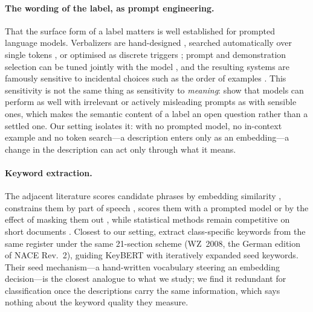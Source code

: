 \documentclass[11pt]{article}
\begin{document}
\paragraph{The wording of the label, as prompt engineering.}
That the surface form of a label matters is well established for prompted
language models. Verbalizers are hand-designed \citep{schick-schutze-2021-exploiting},
searched automatically over single tokens \citep{schick-etal-2020-automatically},
or optimised as discrete triggers \citep{shin-etal-2020-autoprompt}; prompt and
demonstration selection can be tuned jointly with the model
\citep{gao-etal-2021-making}, and the resulting systems are famously sensitive
to incidental choices such as the order of examples
\citep{lu-etal-2022-fantastically}. This sensitivity is not the same thing as
sensitivity to \emph{meaning}: \citet{webson-pavlick-2022-prompt} show that
models can perform as well with irrelevant or actively misleading prompts as
with sensible ones, which makes the semantic content of a label an open question
rather than a settled one. Our setting isolates it: with no prompted model, no
in-context example and no token search---a description enters only as an
embedding---a change in the description can act only through what it means.

\paragraph{Keyword extraction.}
The adjacent literature scores candidate phrases by embedding similarity
\citep{grootendorst-2020-keybert}, constrains them by part of speech
\citep{schopf-etal-2022-patternrank}, scores them with a prompted model
\citep{kong-etal-2023-promptrank} or by the effect of masking them out
\citep{zhang-etal-2022-mderank}, while statistical methods remain competitive on
short documents \citep{campos-etal-2020-yake}. Closest to our setting,
\citet{meisenbacher-etal-2024-improved} extract class-specific keywords from the
same register under the same 21-section scheme (WZ~2008, the German edition of
NACE Rev.~2), guiding KeyBERT with iteratively expanded seed keywords. Their
seed mechanism---a hand-written vocabulary steering an embedding decision---is
the closest analogue to what we study; we find it redundant for classification
once the descriptions carry the same information, which says nothing about the
keyword quality they measure.
\end{document}
